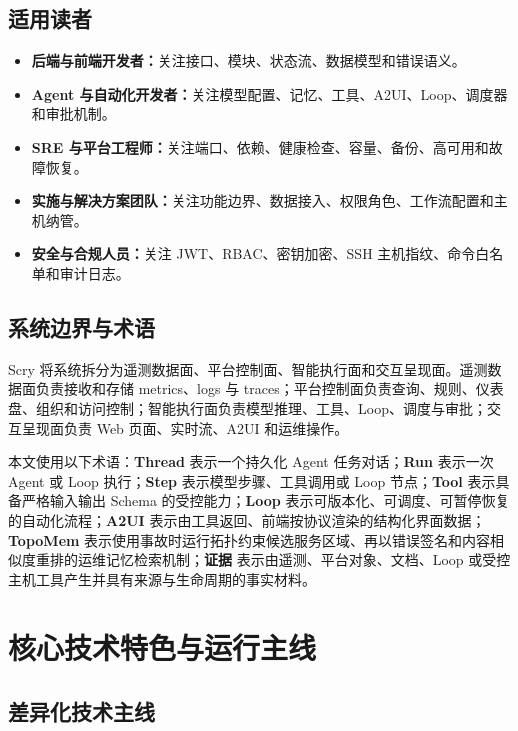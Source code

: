 \documentclass[conference,10pt]{IEEEtran}
\begin{document}
\subsection{适用读者}

\begin{itemize}
  \item \textbf{后端与前端开发者：}关注接口、模块、状态流、数据模型和错误语义。
  \item \textbf{Agent 与自动化开发者：}关注模型配置、记忆、工具、A2UI、Loop、调度器和审批机制。
  \item \textbf{SRE 与平台工程师：}关注端口、依赖、健康检查、容量、备份、高可用和故障恢复。
  \item \textbf{实施与解决方案团队：}关注功能边界、数据接入、权限角色、工作流配置和主机纳管。
  \item \textbf{安全与合规人员：}关注 JWT、RBAC、密钥加密、SSH 主机指纹、命令白名单和审计日志。
\end{itemize}

\subsection{系统边界与术语}

Scry 将系统拆分为遥测数据面、平台控制面、智能执行面和交互呈现面。遥测数据面负责接收和存储 metrics、logs 与 traces；平台控制面负责查询、规则、仪表盘、组织和访问控制；智能执行面负责模型推理、工具、Loop、调度与审批；交互呈现面负责 Web 页面、实时流、A2UI 和运维操作。

本文使用以下术语：\textbf{Thread} 表示一个持久化 Agent 任务对话；\textbf{Run} 表示一次 Agent 或 Loop 执行；\textbf{Step} 表示模型步骤、工具调用或 Loop 节点；\textbf{Tool} 表示具备严格输入输出 Schema 的受控能力；\textbf{Loop} 表示可版本化、可调度、可暂停恢复的自动化流程；\textbf{A2UI} 表示由工具返回、前端按协议渲染的结构化界面数据；\textbf{TopoMem} 表示使用事故时运行拓扑约束候选服务区域、再以错误签名和内容相似度重排的运维记忆检索机制；\textbf{证据} 表示由遥测、平台对象、文档、Loop 或受控主机工具产生并具有来源与生命周期的事实材料。

\section{核心技术特色与运行主线}

\subsection{差异化技术主线}
\end{document}
